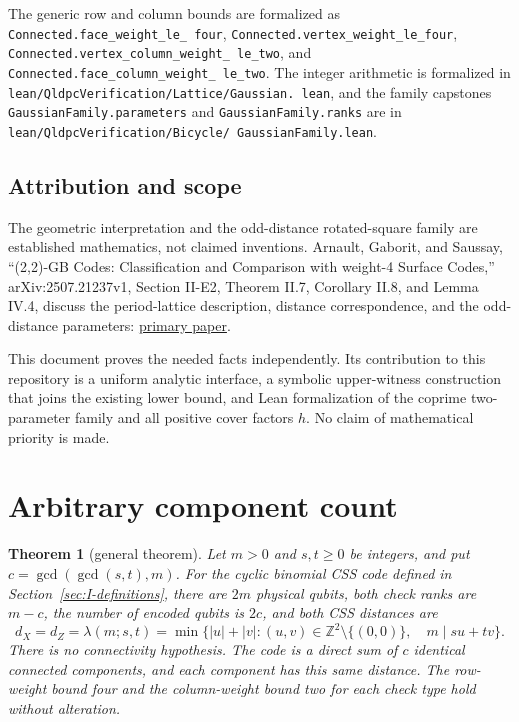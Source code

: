 \documentclass{article}
\newtheorem{theorem}{Theorem}
\numberwithin{equation}{section}
\begin{document}
\begin{sloppypar}
The generic row and column bounds are formalized as
\texttt{Connected.\allowbreak face\_\allowbreak weight\_\allowbreak le\_\allowbreak
four}, \texttt{Connected.\allowbreak vertex\_\allowbreak weight\_\allowbreak le\_\allowbreak four},
\texttt{Connected.\allowbreak vertex\_\allowbreak column\_\allowbreak weight\_\allowbreak
le\_\allowbreak two}, and
\texttt{Connected.\allowbreak face\_\allowbreak column\_\allowbreak weight\_\allowbreak
le\_\allowbreak two}.
The integer arithmetic is formalized in
\texttt{lean/\allowbreak QldpcVerification/\allowbreak Lattice/\allowbreak Gaussian.\allowbreak
lean}, and the family capstones
\texttt{GaussianFamily.\allowbreak parameters} and \texttt{GaussianFamily.\allowbreak ranks} are in
\texttt{lean/\allowbreak QldpcVerification/\allowbreak Bicycle/\allowbreak
GaussianFamily.\allowbreak lean}.
\end{sloppypar}

\subsection{Attribution and scope}\label{sec:I-attribution}

The geometric interpretation and the odd-distance rotated-square family
are established mathematics, not claimed inventions. Arnault, Gaborit,
and Saussay, ``(2,2)-GB Codes: Classification and Comparison with weight-4
Surface Codes,'' arXiv:2507.21237v1, Section II-E2, Theorem II.7,
Corollary II.8, and Lemma IV.4, discuss the period-lattice description,
distance correspondence, and the odd-distance parameters:
\href{https://arxiv.org/html/2507.21237v1}{primary paper}.

This document proves the needed facts independently. Its contribution to
this repository is a uniform analytic interface, a symbolic upper-witness
construction that joins the existing lower bound, and Lean formalization
of the coprime two-parameter family and all positive cover factors \(h\).
No claim of mathematical priority is made.

\section{Arbitrary component count}\label{sec:two}

\begin{theorem}[general theorem]\label{thm:general}
  Let \(m>0\) and \(s,t\ge0\) be integers, and put
  \(c=\gcd(\gcd(s,t),m)\). For the cyclic binomial CSS code defined in
  Section~\ref{sec:I-definitions}, there are \(2m\) physical qubits, both check
  ranks are \(m-c\), the number of encoded qubits is \(2c\), and both CSS distances
  are
  \begin{equation}\label{eq:general-lambda}
    d_X=d_Z=\lambda(m;s,t)
    =\min\{|u|+|v|:(u,v)\in\mathbb Z^2\setminus\{(0,0)\},
    \quad m\mid su+tv\}.
  \end{equation}
  There is no connectivity hypothesis. The code is a direct sum of \(c\)
  identical connected components, and each component has this same distance.
  The row-weight bound four and the column-weight bound two for each check
  type hold without alteration.
\end{theorem}
\end{document}

